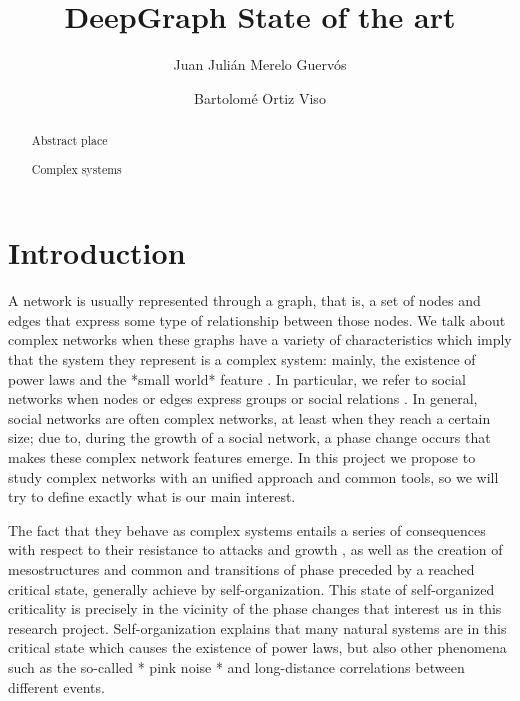 \documentclass[runningheads,a4paper]{llncs}
\newcommand{\keywords}[1]{\par\addvspace\baselineskip
\noindent\keywordname\enspace\ignorespaces#1}
\begin{document}
\mainmatter  %

\title{DeepGraph State of the art }


\author{Juan Julián Merelo Guervós\and Bartolomé Ortiz Viso}



\maketitle


\begin{abstract}
Abstract place
\keywords{Complex systems}
\end{abstract}


\section{Introduction}

A network is usually represented through a graph, that is, a set of
nodes and edges that express some type of relationship between those
nodes. We talk about complex networks \cite{strogatz2001exploring} when
these graphs have a variety of characteristics which imply that the
system they represent is a complex system: mainly, the existence of
power laws \cite{newman2005power} and the *small world* feature
\cite{watts1998collective}. In particular, we refer to social networks
when nodes or edges express groups or social relations
\cite{mislove2007measurement}. In general, social networks are often
complex networks, at least when they reach a certain size; due to,
during the growth of a social network, a phase change occurs that
makes these complex network features emerge. In this project we
propose to study complex networks with an unified approach and common
tools, so we will try to define exactly what is our main interest.

The fact that they behave as complex systems entails a series of
consequences with respect to their resistance to attacks
\cite{albert2000error} and growth  \cite{newman2005power}, as well as
the creation of mesostructures and common  \cite{milo2002network}
and transitions of phase \cite{milo2002network} preceded by a reached
critical state, generally achieve by self-organization. This state of
self-organized criticality \cite{bak2013nature} is precisely in the
vicinity of the phase changes that interest us in this research
project. Self-organization explains that many natural systems are in
this critical state which causes the existence of power laws, but also
other phenomena such as the so-called * pink noise * and long-distance
correlations between different events. 
\end{document}
